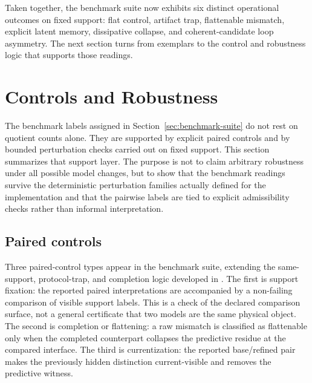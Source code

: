 \documentclass[11pt]{article}
\theoremstyle{definition}
\begin{document}
\begin{table}[H]
\centering
\caption{Exact metrics for the dissipative and memory-wheel benchmarks.}
\label{tab:bench-flagship-family}
\footnotesize
\setlength{\tabcolsep}{4pt}
\end{table}

Taken together, the benchmark suite now exhibits six distinct operational outcomes on fixed support: flat control, artifact trap, flattenable mismatch, explicit latent memory, dissipative collapse, and coherent-candidate loop asymmetry. The next section turns from exemplars to the control and robustness logic that supports those readings.

\section{Controls and Robustness}\label{sec:controls-robustness}
The benchmark labels assigned in Section~\ref{sec:benchmark-suite} do not rest on quotient counts alone. They are supported by explicit paired controls and by bounded perturbation checks carried out on fixed support. This section summarizes that support layer. The purpose is not to claim arbitrary robustness under all possible model changes, but to show that the benchmark readings survive the deterministic perturbation families actually defined for the implementation and that the pairwise labels are tied to explicit admissibility checks rather than informal interpretation.

\subsection{Paired controls}\label{subsec:controls-pairs}
Three paired-control types appear in the benchmark suite, extending the same-support, protocol-trap, and completion logic developed in \citep{Tsiokos2026EventPackages,Tsiokos2026ProtocolTrap,Tsiokos2026FlattenStone}. The first is support fixation: the reported paired interpretations are accompanied by a non-failing comparison of visible support labels. This is a check of the declared comparison surface, not a general certificate that two models are the same physical object. The second is completion or flattening: a raw mismatch is classified as flattenable only when the completed counterpart collapses the predictive residue at the compared interface. The third is currentization: the reported base/refined pair makes the previously hidden distinction current-visible and removes the predictive witness.
\end{document}

